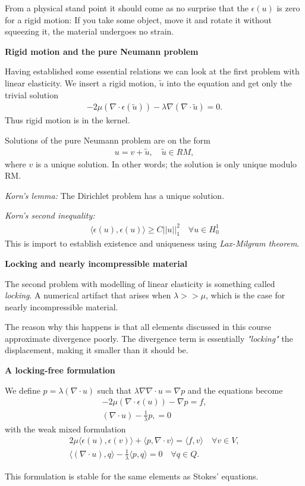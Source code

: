 \documentclass[epsfig,11pt]{article}
\newcommand{\inr}[1]{ \Big \langle #1 \Big \rangle}
\begin{document}
From a physical stand point it should come as no surprise that the $\epsilon(u)$ is zero for a rigid motion: If you take some object, move it and rotate it without squeezing it, the material undergoes no strain.

\textbf{Rigid motion and the pure Neumann problem}

Having established some essential relations we can look at the first problem with linear elasticity. We insert a rigid motion, $\tilde{u}$ into the equation and get only the trivial solution
\begin{align*}
-2 \mu (\nabla \cdot \epsilon (\tilde{u})) - \lambda \nabla (\nabla \cdot \tilde{u}) = 0.
\end{align*}
Thus rigid motion is in the kernel.

Solutions of the pure Neumann problem are on the form 
\begin{align*}
u = v + \tilde{u}, \quad \tilde{u} \in RM,
\end{align*}
where $v$ is a unique solution. In other words; the solution is only unique modulo RM.

\emph{Korn's lemma:} The Dirichlet problem has a unique solution. 

\emph{Korn's second inequality:}
\begin{align}
\inr{\epsilon (u),\epsilon (u)} \geq C||u||_1^2 \quad \forall u \in H^1_0 
\end{align}
This is import to establish existence and uniqueness using \emph{Lax-Milgram theorem}.

\textbf{Locking and nearly incompressible material}

The second problem with modelling of linear elasticity is something called \emph{locking}. A numerical artifact that arises when $\lambda >> \mu$, which is the case for  nearly incompressible material. 

The reason why this happens is that all elements discussed in this course approximate divergence poorly. The divergence term is essentially \emph{"locking"} the displacement, making it smaller than it should be.

\textbf{A locking-free formulation}

We define $p=\lambda(\nabla \cdot u)$ such that $\lambda \nabla \nabla \cdot u = \nabla p$  and the  equations become
\begin{align}
-2 \mu (\nabla \cdot \epsilon (u)) - \nabla p = f, \\ 
(\nabla \cdot u) - \frac{1}{\lambda} p, = 0
\end{align}
with the weak mixed formulation 
\begin{align}
 2\mu \inr{\epsilon(u) , \epsilon(v) }  + \inr{p ,\nabla \cdot v } = \inr{f,v} \quad \forall v \in V,  \\
\inr{(\nabla \cdot u),q } - \frac{1}{\lambda } \inr{ p,q} = 0 \quad \forall q \in Q. 
\end{align}

This formulation is stable for the same elements as Stokes' equations. 
\end{document}
